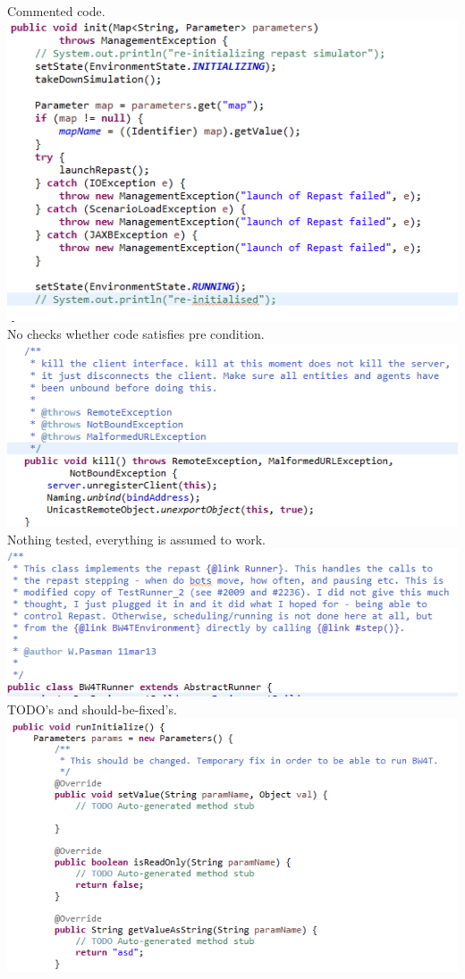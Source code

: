 Commented code.\\
\includegraphics[width=\linewidth]{Transferability/lelijkCode.PNG} \\ 

No checks whether code satisfies pre condition.\\
\includegraphics[width=\linewidth]{Transferability/noEntityCheck.PNG} \\ 

Nothing tested, everything is assumed to work.\\
\includegraphics[width=\linewidth]{Transferability/notTested.PNG} \\ 

TODO's and should-be-fixed's.\\
\includegraphics[width=\linewidth]{Transferability/TODOs+shouldBeFixed.PNG} \\